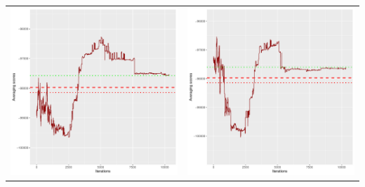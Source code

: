 \documentclass[]{scrartcl}
\begin{document}
\begin{table}[h!]
\begin{tabular}{cc}
\includegraphics[scale = 0.4]{./figs/hepar2/v1/25/avgBoundsEvolution-10352.pdf} & 
\includegraphics[scale = 0.4]{./figs/hepar2/v1/50/avgBoundsEvolution-10352.pdf} \\

\end{tabular}
\end{table}
\end{document}
